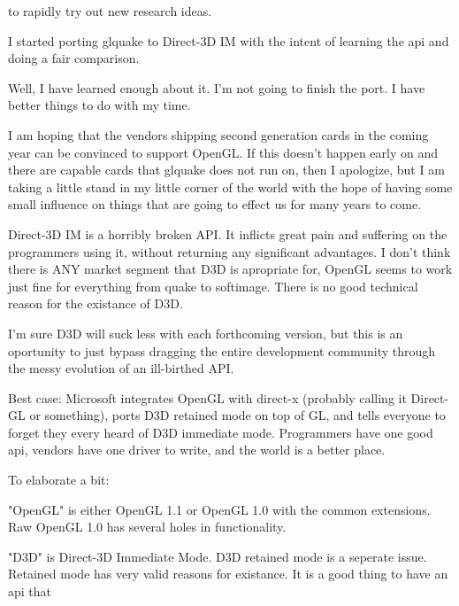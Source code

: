 \begin{allintypewriter}
to rapidly try out new research ideas.\\ 
\par
I started porting glquake to Direct-3D IM with the intent of learning the api
and doing a fair comparison.\\ 
\par
Well, I have learned enough about it. I'm not going to finish the port. I have
better things to do with my time.\\ 
\par
I am hoping that the vendors shipping second generation cards in the coming 
year can be convinced to support OpenGL. If this doesn't happen early on and
there are capable cards that glquake does not run on, then I apologize, but I am
taking a little stand in my little corner of the world with the hope of having 
some small influence on things that are going to effect us for many years to come.\\ 
\par
Direct-3D IM is a horribly broken API. It inflicts great pain and suffering on 
the programmers using it, without returning any significant advantages. I don't 
think there is ANY market segment that D3D is apropriate for, OpenGL seems to work
just fine for everything from quake to softimage. There is no good technical reason
for the existance of D3D.\\ 
\par
I'm sure D3D will suck less with each forthcoming version, but this is an oportunity 
to just bypass dragging the entire development community through the messy evolution 
of an ill-birthed API.\\ 
\par
Best case: Microsoft integrates OpenGL with direct-x (probably calling it Direct-GL 
or something), ports D3D retained mode on top of GL, and tells everyone to forget 
they every heard of D3D immediate mode. Programmers have one good api, vendors have 
one driver to write, and the world is a better place.\\ 
\par
To elaborate a bit:\\ 
\par
"OpenGL" is either OpenGL 1.1 or OpenGL 1.0 with the common extensions. Raw OpenGL 1.0
has several holes in functionality.\\ 
\par
"D3D" is Direct-3D Immediate Mode. D3D retained mode is a seperate issue. Retained 
mode has very valid reasons for existance. It is a good thing to have an api that 

\end{allintypewriter}
